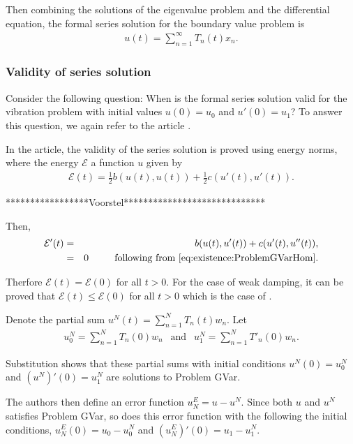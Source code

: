 \documentclass[../../main.tex]{subfiles}
\begin{document}
Then combining the solutions of the eigenvalue problem and the differential equation, the formal series solution for the boundary value problem is
\begin{eqnarray}
	u(t) = \sum_{n=1}^{\infty} T_n(t)x_n. \label{eq:1D_Model:ModalAnalysisSeriesSolution}
\end{eqnarray}


\subsubsection{Validity of series solution}
Consider the following question: When is the formal series solution valid for the vibration problem with initial values $u(0) = u_0$ and $u'(0) = u_1$? To answer this question, we again refer to the article \cite{CVV18}.

In the article, the validity of the series solution is proved using energy norms, where the energy $\mathcal{E}$ a function $u$ given by
\begin{eqnarray}
	\mathcal{E} (t) = \frac{1}{2} b(u(t), u(t)) + \frac{1}{2} c(u'(t), u'(t)). \label{eq:1D_Model:ModalAnalysisEnergy}
\end{eqnarray}


*****************Voorstel*****************************

Then,
\begin{eqnarray*}
	\mathcal{E}'(t) & = & b(u(t), u'(t)) + c(u'(t), u''(t)),\\
					& = & 0 \ \ \ \ \ \ \ \textrm{ following from \eqref{eq:existence:ProblemGVarHom}}. 
\end{eqnarray*}

Therfore $\mathcal{E}(t) = \mathcal{E}(0)$ for all $t>0$. For the case of weak damping, it can be proved that $\mathcal{E}(t) \leq \mathcal{E}(0)$ for all $t>0$ which is the case of \cite{CVV18}.

Denote the partial sum $u^{N}(t) = \sum_{n=1}^{N} T_{n}(t)w_n$. Let
\begin{eqnarray*}
	u_0^{N} = \sum_{n=1}^{N} T_n(0) w_n \ \ \textrm{ and } \ \ u_{1}^{N} =\sum_{n=1}^{N} T'_n(0) w_n.
\end{eqnarray*}

Substitution shows that these partial sums with initial conditions $u^N(0) = u^N_0$ and $(u^N)'(0) = u^N_1$ are solutions to Problem GVar.

The authors then define an error function $u^E_N = u - u^N$. Since both $u$ and $u^N$ satisfies Problem GVar, so does this error function with the following the initial conditions, $u^E_N(0) = u_0 - u^N_0$ and $(u^E_N)'(0) = u_1 - u^N_1$.
\end{document}

